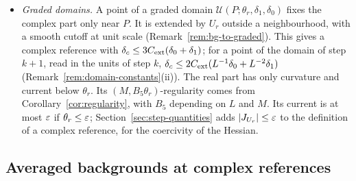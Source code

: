 \begin{itemize}
\item \emph{Graded domains.} A point of a graded domain $\mathcal U(P;\theta_r,\delta_1,\delta_0)$ fixes the complex part only near $P$. It is extended by $U_r$ outside a neighbourhood, with a smooth cutoff at unit scale (Remark~\ref{rem:bg-to-graded}). This gives a complex reference with $\delta_c\le3C_{\rm ext}(\delta_0+\delta_1)$; for a point of the domain of step $k+1$, read in the units of step $k$, $\delta_c\le2C_{\rm ext}(L^{-1}\delta_0+L^{-2}\delta_1)$ (Remark~\ref{rem:domain-constants}(ii)). The real part has only curvature and current below $\theta_r$. Its $(M,B_5\theta_r)$-regularity comes from Corollary~\ref{cor:regularity}, with $B_5$ depending on $L$ and $M$. Its current is at most $\varepsilon$ if $\theta_r\le\varepsilon$; Section~\ref{sec:step-quantities} adds $|J_{U_r}|\le\varepsilon$ to the definition of a complex reference, for the coercivity of the Hessian.
\end{itemize}

\subsection{Averaged backgrounds at complex references}\label{sec:AB-proof}

